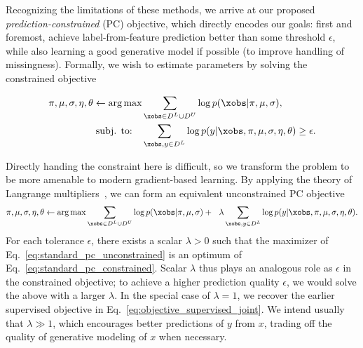 Recognizing the limitations of these methods, we arrive at our proposed \emph{prediction-constrained} (PC) objective, which directly encodes our goals: first and foremost, achieve label-from-feature prediction better than some threshold $\epsilon$, while also learning a good generative model if possible (to improve handling of missingness). Formally, we wish to estimate parameters by solving the constrained objective

\begin{align}
\pi, \mu, \sigma, \eta, \theta \gets \arg\max & \sum_{\xobs \in D^L \cup D^U} \log p(\xobs | \pi, \mu, \sigma) 
\label{eq:standard_pc_constrained},
\\ \notag
\text{subj. to:} \quad & 
\sum_{\xobs, y \in D^L} \log p(y | \xobs, \pi, \mu, \sigma, \eta, \theta) \geq \epsilon.
\end{align}

Directly handing the constraint here is difficult, so we transform the problem to be more amenable to modern gradient-based learning. 
By applying the theory of Langrange multipliers~\citep{bertsekasConstrainedOptLagrange1996}, we can form an equivalent unconstrained PC objective
\begin{align}
\pi, \mu, \sigma, \eta, \theta \gets \arg\max \sum_{\xobs \in D^L \cup D^U} \log p(\xobs | \pi, \mu, \sigma) 
+ ~~\lambda \sum_{\xobs, y \in D^L} \log p(y | \xobs, \pi, \mu, \sigma, \eta, \theta).
\label{eq:standard_pc_unconstrained}
\end{align}
For each tolerance $\epsilon$, there exists a scalar $\lambda > 0$  such that the maximizer of Eq.~\eqref{eq:standard_pc_unconstrained} 
is an optimum of Eq.~\eqref{eq:standard_pc_constrained}. 
Scalar $\lambda$ thus plays an analogous role as $\epsilon$ in the constrained objective; to achieve a higher prediction quality $\epsilon$, we would solve the above with a larger $\lambda$. 
In the special case of $\lambda = 1$, we recover the earlier supervised objective in Eq.~\eqref{eq:objective_supervised_joint}. 
We intend usually that $\lambda \gg 1$, which encourages better predictions of $y$ from $x$, trading off the quality of generative modeling of $x$ when necessary.


